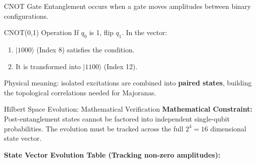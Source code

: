 \documentclass[aspectratio=169, 12pt]{beamer}
\newcommand{\ket}[1]{|#1\rangle}
\begin{document}
\begin{frame}{CNOT Gate}
    Entanglement occurs when a gate moves amplitudes between binary configurations.
    \begin{exampleblock}{CNOT(0,1) Operation}
        If $q_0$ is 1, flip $q_1$. In the vector:
        \begin{enumerate}
            \item $\ket{1000}$ (Index 8) satisfies the condition.
            \item It is transformed into $\ket{1100}$ (Index 12).
        \end{enumerate}
        Physical meaning: isolated excitations are combined into \textbf{paired states}, building the topological correlations needed for Majoranas.
    \end{exampleblock}
\end{frame}


\begin{frame}{Hilbert Space Evolution: Mathematical Verification}
    \textbf{Mathematical Constraint:} Post-entanglement states cannot be factored into independent single-qubit probabilities. The evolution must be tracked across the full $2^4 = 16$ dimensional state vector.
    
    \vspace{0.3cm}
    \textbf{State Vector Evolution Table (Tracking non-zero amplitudes):}
    
    \vspace{0.2cm}
    \begin{table}[h]
    \centering
    \renewcommand{\arraystretch}{1.5}
    \end{table}
\end{frame}
\end{document}
